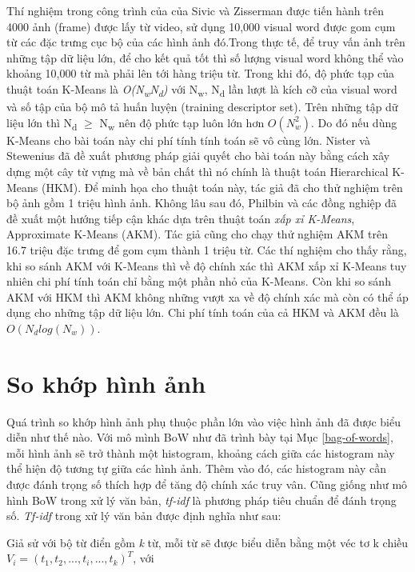 Thí nghiệm trong công trình của của Sivic và Zisserman \cite{sivic2003video} được tiến hành trên 4000 ảnh (frame) được lấy từ video, sử dụng 10,000 visual word được gom cụm từ các đặc trưng cục bộ của các hình ảnh đó.Trong thực tế, để truy vấn ảnh trên những tập dữ liệu lớn, để cho kết quả tốt thì số lượng visual word không thể vào khoảng 10,000 từ mà phải lên tới hàng triệu từ\cite{philbin2007object}. Trong khi đó, độ phức tạp của thuật toán K-Means là \textit{O(N\textsubscript{w}N\textsubscript{d})} với N\textsubscript{w}, N\textsubscript{d} lần lượt là kích cỡ của visual word và số tập của bộ mô tả huấn luyện (training descriptor set). Trên những tập dữ liệu lớn thì N\textsubscript{d} $\geq$ N\textsubscript{w} nên độ phức tạp luôn lớn hơn $O(N^2_w)$. Do đó nếu dùng K-Means cho bài toán này chi phí tính tính toán sẽ vô cùng lớn. Nister và Stewenius \cite{nister2006scalable} đã đề xuất phương pháp giải quyết cho bài toán này bằng cách xây dựng một cây từ vựng mà về bản chất thì nó chính là thuật toán Hierarchical K-Means (HKM). Để minh họa cho thuật toán này, tác giả đã cho thử nghiệm trên bộ ảnh gồm 1 triệu hình ảnh. Không lâu sau đó, Philbin và các đồng nghiệp \cite{philbin2007object} đã đề xuất một hướng tiếp cận khác dựa trên thuật toán \textit{xấp xỉ K-Means}, Approximate K-Means (AKM). Tác giả cũng cho chạy thử nghiệm AKM trên 16.7 triệu đặc trưng để gom cụm thành 1 triệu từ. Các thí nghiệm cho thấy rằng, khi so sánh AKM với K-Means thì về độ chính xác thì AKM xấp xỉ K-Means tuy nhiên chi phí tính toán chỉ bằng một phần nhỏ của K-Means. Còn khi so sánh AKM với HKM thì AKM không những vượt xa về độ chính xác mà còn có thể áp dụng cho những tập dữ liệu lớn. Chi phí tính toán của cả HKM và AKM đều là $O(N_d log(N_w))$.

\section{So khớp hình ảnh}
Quá trình so khớp hình ảnh phụ thuộc phần lớn vào việc hình ảnh đã được biểu diễn như thế nào. Với mô mình BoW như đã trình bày tại Mục \ref{bag-of-words}, mỗi hình ảnh sẽ trở thành một histogram, khoảng cách giữa các histogram này thể hiện độ tương tự giữa các hình ảnh. Thêm vào đó, các histogram này cần được đánh trọng số thích hợp để tăng độ chính xác truy vân. Cũng giống như mô hình BoW trong xử lý văn bản, \textit{tf-idf}\cite{manning2008introduction} là phương pháp tiêu chuẩn để đánh trọng số. \textit{Tf-idf} trong xử lý văn bản được định nghĩa như sau:

Giả sử với bộ từ điển gồm \textit{k} từ, mỗi từ sẽ được biểu diễn bằng một véc tơ k chiều $V_i = (t_1, t_2, ..., t_i, ..., t_k)^T$, với 

